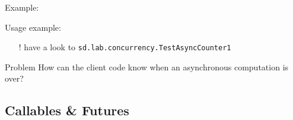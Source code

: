 \documentclass{beamer}\mode<presentation>{\usetheme{AMSBolognaFC}}
\begin{document}
\begin{frame}[allowframebreaks]
    \framebreak

    Example:
	

    \framebreak

    Usage example:
    
    \begin{itemize}
        \item[!] have a look to \texttt{sd.lab.concurrency.\alert{TestAsyncCounter1}}
    \end{itemize}

%

    \framebreak

    \begin{alertblock}{Problem}\centering
        How can the client code know when an asynchronous computation is over?
    \end{alertblock}

\end{frame}

\subsection{Callables \& Futures}
\end{document}
